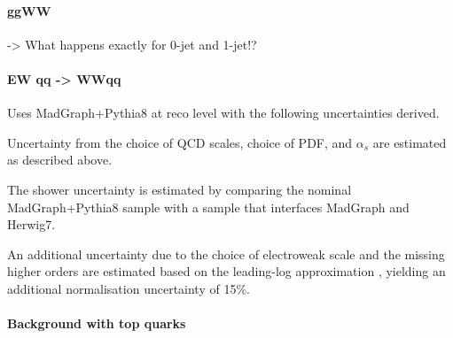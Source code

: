 \paragraph{ggWW} 
-> What happens exactly for 0-jet and 1-jet!?


\paragraph{EW qq -> WWqq}
Uses MadGraph+Pythia8 at reco level with the following uncertainties derived.

Uncertainty from the choice of QCD scales, choice of PDF, and $\alpha_s$ are estimated as described above.

The shower uncertainty is estimated by comparing the nominal MadGraph+Pythia8 sample with a sample that interfaces MadGraph and Herwig7. 

An additional uncertainty due to the choice of electroweak scale and the missing higher orders are estimated based on the leading-log approximation \cite{Denner_2019}, yielding an additional normalisation uncertainty of 15\%. 




\paragraph{Background with top quarks}


